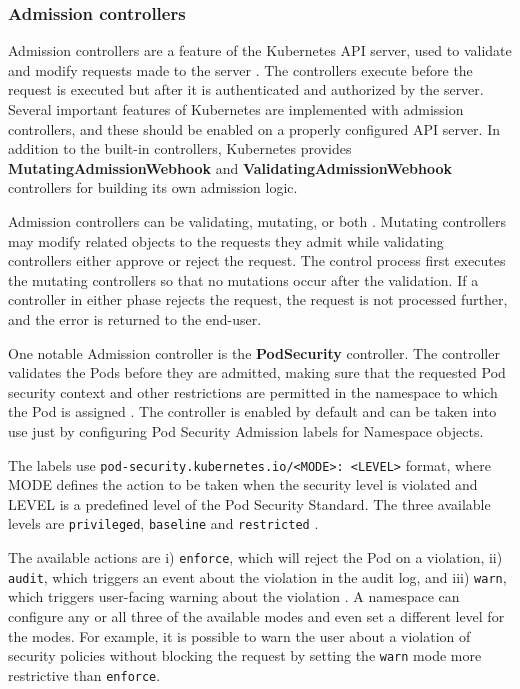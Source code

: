 \documentclass[english, 12pt, a4paper, sci, utf8, a-2b, online]{aaltothesis}
\begin{document}
\subsubsection{Admission controllers} \label{admission-controllers}

Admission controllers are a feature of the Kubernetes API server, used to validate and modify requests made to the server \cite{k8s-docs-admission}.
The controllers execute before the request is executed but after it is authenticated and authorized by the server.
Several important features of Kubernetes are implemented with admission controllers, and these should be enabled on a properly configured API server.
In addition to the built-in controllers, Kubernetes provides \textbf{MutatingAdmissionWebhook} and \textbf{ValidatingAdmissionWebhook} controllers for building its own admission logic.

Admission controllers can be validating, mutating, or both \cite{k8s-docs-admission}.
Mutating controllers may modify related objects to the requests they admit while validating controllers either approve or reject the request.
The control process first executes the mutating controllers so that no mutations occur after the validation.
If a controller in either phase rejects the request, the request is not processed further, and the error is returned to the end-user.

One notable Admission controller is the \textbf{PodSecurity} controller.
The controller validates the Pods before they are admitted, making sure that the requested Pod security context and other restrictions are permitted in the namespace to which the Pod is assigned \cite{k8s-docs-admission}.
The controller is enabled by default and can be taken into use just by configuring Pod Security Admission labels for Namespace objects.

The labels use \lstinline{pod-security.kubernetes.io/<MODE>: <LEVEL>} format, where MODE defines the action to be taken when the security level is violated and LEVEL is a predefined level of the Pod Security Standard.
The three available levels are \lstinline{privileged}, \lstinline{baseline} and \lstinline{restricted} \cite{k8s-docs-pss}.

The available actions are i) \lstinline{enforce}, which will reject the Pod on a violation, ii) \lstinline{audit}, which triggers an event about the violation in the audit log, and iii) \lstinline{warn}, which triggers user-facing warning about the violation \cite{k8s-docs-psa}.
A namespace can configure any or all three of the available modes and even set a different level for the modes.
For example, it is possible to warn the user about a violation of security policies without blocking the request by setting the \lstinline{warn} mode more restrictive than \lstinline{enforce}.
\end{document}
